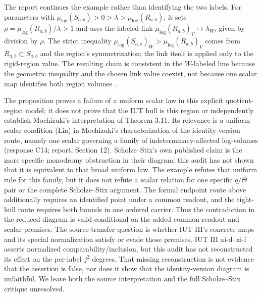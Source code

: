 \documentclass[11pt]{article}
\begin{document}
The report continues the example rather than identifying the two labels. For parameters with $\mu_{\log}(S_{a,b})>0>\lambda>\mu_{\log}(R_{a,b})$, it sets $\rho=\mu_{\log}(R_{a,b})/\lambda>1$ and uses the labeled link $\mu_{\log}(R_{a,b})_V\mapsto\lambda_W$, given by division by $\rho$. The strict inequality $\mu_{\log}(S_{a,b})_W>\mu_{\log}(R_{a,b})_V$ comes from $R_{a,b}\subset S_{a,b}$ and the region's symmetrization; the link itself is applied only to the rigid-region value. The resulting chain is consistent in the $W$-labeled line because the geometric inequality and the chosen link value coexist, not because one scalar map identifies both region volumes \cite[LVEx, pp.~24--25]{MochizukiReport2018}.

The proposition proves a failure of a uniform scalar law in this explicit quotient-region model; it does not prove that the IUT hull is this region or independently establish Mochizuki's interpretation of Theorem 3.11. Its relevance is a uniform scalar condition (Lin) in Mochizuki's characterization of the identity-version route, namely one scalar governing a family of indeterminacy-affected log-volumes (response C14; report, Section 12). Scholze--Stix's own published claim is the more specific monodromy obstruction in their diagram; this audit has not shown that it is equivalent to that broad uniform law. The example refutes that uniform rule for this family, but it does not refute a scalar relation for one specific $q/\Theta$ pair or the complete Scholze--Stix argument. The formal endpoint route above additionally requires an identified point under a common readout, and the tight-hull route requires both bounds in one ordered carrier. Thus the contradiction in the reduced diagram is valid conditional on the added common-readout and scalar premises. The source-transfer question is whether IUT III's concrete maps and its special normalization satisfy or evade those premises. IUT III xi-d--xi-f asserts normalized comparability/inclusion, but this audit has not reconstructed its effect on the per-label $j^2$ degrees. That missing reconstruction is not evidence that the assertion is false, nor does it show that the identity-version diagram is unfaithful. We leave both the source interpretation and the full Scholze--Stix critique unresolved.
\end{document}
